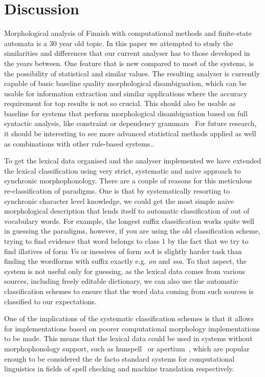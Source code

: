 \documentclass[a4paper,12pt]{article}
\begin{document}
\section{Discussion}
\label{sec:discussion}

Morphological analysis of Finnish with computational methods and finite-state
automata is a 30 year old topic. In this paper we attempted to study the
similarities and differences that our current analyser has to those developed
in the years between. One feature that is new compared to most of the systems,
is the possibility of statistical and similar values. The resulting analyser is
currently capable of basic baseline quality morphological disambiguation, which
can be usable for information extraction and similar applications where the
accuracy requirement for top results is not so crucial. This should also be
usable as baseline for systems that perform morphological disambiguation based
on full syntactic analysis, like constraint or dependency
grammars~\citep{karlsson1995constraint} For future research, it should be
interesting to see more advanced statistical methods applied as well as
combinations with other rule-based systems..

To get the lexical data organised and the analyser implemented we have extended
the lexical classification using very strict, systematic and naive approach to
synchronic morphophonology. There are a couple of reasons for this meticulous
re-classification of paradigms. One is that by systematically resorting to
synchronic character level knowledge, we could get the most simple naive
morphological description that lends itself to automatic classification of out
of vocabulary words. For example, the longest suffix classification works quite
well in guessing the paradigms, however, if you are using the old
classification scheme, trying to find evidence that word belongs to class 1 by
the fact that we try to find illatives of form \emph{Vn} or inessives of form
\emph{ssA} is slightly harder task than finding the wordforms with suffix
exactly e.g.  \emph{on} and \emph{ssa}. To that aspect, the system is not
useful only for guessing, as the lexical data comes from various sources,
including freely editable dictionary, we can also use the automatic
classification schemes to ensure that the word data coming from such sources is
classified to our expectations.

One of the implications of the systematic classification schemes is that it
allows for implementations based on poorer computational morphology
implementations to be made. This means that the lexical data could be used in
systems without morphophonology support, such as
hunspell~\citep{tron2005hunmorph} or apertium~\citep{apertium}, which are
popular enough to be considered the de facto standard systems for computational
linguistics in fields of spell checking and machine translation respectively. 
\end{document}
